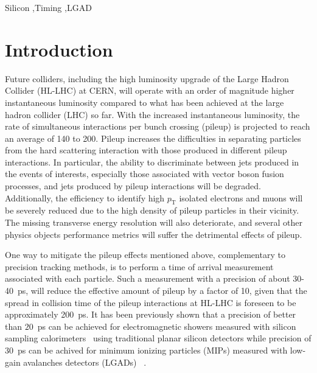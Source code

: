 \documentclass[preprint,1p]{elsarticle}
\begin{document}
\begin{frontmatter}
\begin{keyword}

Silicon \sep Timing \sep LGAD

\end{keyword}

\end{frontmatter}

\tableofcontents


\section{Introduction}

Future colliders, including the high luminosity upgrade of the Large Hadron
Collider (HL-LHC) at CERN, will operate with an order of magnitude higher
instantaneous luminosity compared to what has been achieved at the
large hadron collider (LHC) so far.
With the increased instantaneous luminosity, the rate of simultaneous
interactions per bunch crossing (pileup) is projected to reach an average of 140
to 200. Pileup increases the difficulties in separating
particles from the hard scattering interaction with those
produced in different pileup interactions. In particular, the ability to discriminate between
jets produced in the events of interests, especially those associated with vector
boson fusion processes, and jets produced by pileup interactions will be
degraded. Additionally, the efficiency to identify high $p_{\mathrm{T}}$ isolated electrons
and muons will be severely reduced due to the high density of pileup particles
in their vicinity. The missing transverse energy resolution will also deteriorate, and several
other physics objects performance metrics will suffer the
detrimental effects of pileup.

One way to mitigate the pileup effects mentioned above, complementary to
precision tracking methods, is to perform a time of arrival measurement
associated with each particle. Such a measurement with a precision of about
30-40~\si{ps}, will reduce the effective amount of pileup by a factor of 10,
given that the spread in collision time of the pileup interactions at HL-LHC is
foreseen to be approximately 200~\si{ps}. It has been previously shown that a
precision of better than $20$~\si{ps} can be achieved for electromagnetic
showers measured with silicon sampling
calorimeters~\cite{Apresyan201662,Apresyan2017_NSSMIC,AKCHURIN201731} using
traditional planar silicon detectors while precision of $30$~\si{ps} can be achived for minimum ionizing particles (MIPs) measured
with low-gain avalanches detectors (LGADs) ~\cite{Apresyan:2018oln, Cartiglia201783, PELLEGRINI201412}.
\end{document}
